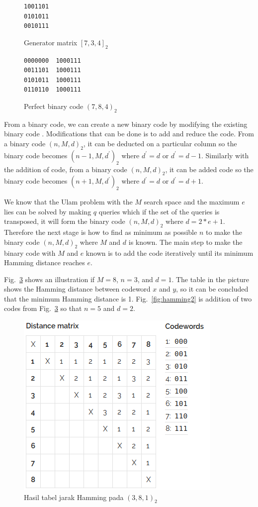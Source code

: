 \documentclass{TTP_DSL2006}
\begin{document}
\begin{figure}
\centering
\begin{BVerbatim}
1001101
0101011
0010111
\end{BVerbatim}
\caption{Generator matrix $[7,3,4]_2$}
\label{fig:generator734}
\end{figure}

\begin{figure}
\centering
\begin{BVerbatim}
0000000  1000111
0011101  1000111
0101011  1000111
0110110  1000111
\end{BVerbatim}
\caption{Perfect binary code $(7,8,4)_2$}
\label{fig:binarycode784}
\end{figure}

From a binary code, we can create a new binary code by modifying the existing binary code \cite{Huffman}. Modifications that can be done is to add and reduce the code. From a binary code $(n,M,d)_2 $, it can be deducted on a particular column so the binary code becomes $(n-1,M,d^\prime) _2 $ where $d^\prime = d$ or $d^\prime = d-1$. Similarly with the addition of code, from a binary code $(n,M,d)_2$, it can be added code so the binary code becomes $(n+1,M,d^\prime)_2 $ where $d^\prime = d$ or $d^\prime = d+1$.

We know that the Ulam problem with the $M$ search space and the maximum $e$ lies can be solved by making $q$ queries which if the set of the queries is transposed, it will form the binary code $(n,M,d) _2$ where $d=2*e+1$. Therefore the next stage is how to find as minimum as possible $n$ to make the binary code $(n,M,d)_2$ where $M$ and $d$ is known. The main step to make the binary code with $M$ and $e$ known is to add the code iteratively until its minimum Hamming distance reaches $e$.

Fig.~\ref{fig:hamming1} shows an illustration if $M = 8$, $n = 3$, and $d = 1$. The table in the picture shows the Hamming distance between codeword $x$ and $y$, so it can be concluded that the minimum Hamming distance is 1. Fig.~\ref{fig:hamming2} is addition of two codes from Fig.~\ref{fig:hamming1} so that $n = 5$ and $d = 2$.

\begin{figure}
\centering
\includegraphics[scale=0.7]{../img/hamming1.png}
\caption{Hasil tabel jarak Hamming pada $(3,8,1)_2$}
\label{fig:hamming1}
\end{figure}
\end{document}
